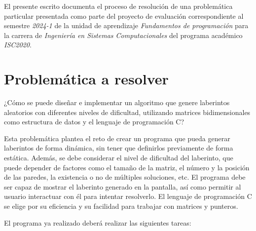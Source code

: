 \documentclass[a4paper,12pt]{article}
\begin{document}
El presente escrito documenta el proceso de resolución de una problemática particular presentada como parte del proyecto de evaluación correspondiente al semestre \emph{2024-1} de la unidad de aprendizaje \emph{Fundamentos de programación} para la carrera de \emph{Ingeniería en Sistemas Computacionales} del programa académico \emph{ISC2020}.

\section{Problemática a resolver}

¿Cómo se puede diseñar e implementar un algoritmo que genere laberintos aleatorios con diferentes niveles de dificultad, utilizando matrices bidimensionales como estructura de datos y el lenguaje de programación C?\par

Esta problemática plantea el reto de crear un programa que pueda generar laberintos de forma dinámica, sin tener que definirlos previamente de forma estática. Además, se debe considerar el nivel de dificultad del laberinto, que puede depender de factores como el tamaño de la matriz, el número y la posición de las paredes, la existencia o no de múltiples soluciones, etc. El programa debe ser capaz de mostrar el laberinto generado en la pantalla, así como permitir al usuario interactuar con él para intentar resolverlo. El lenguaje de programación C se elige por su eficiencia y su facilidad para trabajar con matrices y punteros.\par
\vspace{.5cm}
El programa ya realizado deberá realizar las siguientes tareas:
\end{document}
